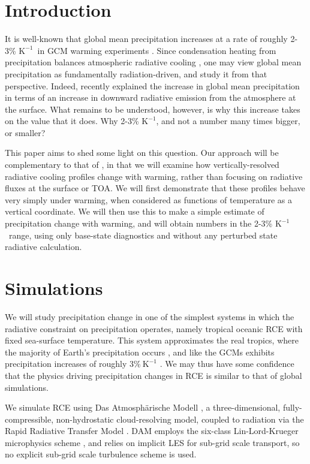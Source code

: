 \documentclass[10pt]{article}
\newcommand{\Kinverse}{\ensuremath{\mathrm{K^{-1}}}}
\begin{document}
\section {Introduction}
It is well-known that global mean precipitation  increases at a rate of roughly 2-3\% \Kinverse\  in GCM warming experiments \citep{stephens2008,lambert2008,held2006}. Since condensation heating from precipitation balances atmospheric radiative cooling \citep{ogorman2012,allen2002}, one may view global mean precipitation as  fundamentally radiation-driven, and study it from that perspective. Indeed, \cite{pendergrass2014} recently explained the increase in global mean precipitation in terms of an increase in downward radiative emission from the atmosphere at the surface.  What remains to be understood, however, is why this increase takes on the value that it does. Why 2-3\% \Kinverse, and not a number many times bigger, or smaller?

This paper aims  to shed some light on this question. Our approach will be complementary to that of \cite{pendergrass2014}, in that we will examine how vertically-resolved radiative cooling profiles change with warming, rather than focusing on radiative fluxes at the surface or TOA. We will first  demonstrate that these profiles behave very simply under warming, when considered as functions of temperature as a vertical coordinate. We will then use this  to make a simple estimate of precipitation change with warming, and will obtain numbers in the 2-3\% \Kinverse\ range, using only base-state diagnostics and without any perturbed state radiative calculation.

\section{Simulations}
We will study precipitation change in one of the simplest systems in which the radiative constraint on precipitation operates, namely tropical oceanic RCE with fixed sea-surface temperature. This system approximates the real tropics, where the majority of Earth's precipitation occurs \citep{simpson1988}, and like the GCMs exhibits precipitation increases of roughly $ 3 \%\ \Kinverse$ \citep{romps2011, muller2011b}. We may thus have some confidence that the physics driving precipitation changes in RCE is similar to that of global simulations.

We simulate RCE using Das Atmosph\"arische Modell \citep[DAM,][]{romps2008},   a three-dimensional, fully-compressible, non-hydrostatic cloud-resolving model, coupled to radiation via the Rapid Radiative Transfer Model 
\citep[RRTM,][]{mlawer1997}. DAM employs the six-class Lin-Lord-Krueger  microphysics scheme \citep{lin1983, lord1984, krueger1995}, and relies on implicit LES \citep{margolin2006} for sub-grid scale transport, so no explicit sub-grid scale turbulence scheme is used.
	
\end{document}
